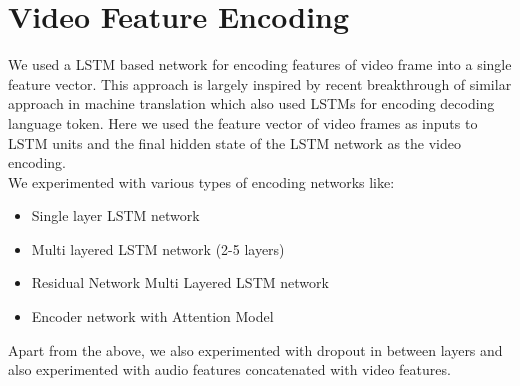 \documentclass[11pt]{article}
\begin{document}
\section {Video Feature Encoding}
	We used a LSTM based network for encoding features of video frame into a single feature vector. This approach is largely inspired by recent
	breakthrough of similar approach in machine translation which also used LSTMs for encoding decoding language token. Here we used the feature
	vector of video frames as inputs to LSTM units and the final hidden state of the LSTM network as the video encoding.\\ 
	We experimented with various types of encoding networks like:
	\begin{itemize}
		\item Single layer LSTM network
		\item Multi layered LSTM network (2-5 layers)
		\item Residual Network Multi Layered LSTM network
		\item Encoder network with Attention Model
	\end{itemize}
	Apart from the above, we also experimented with dropout in between layers and also experimented with audio features concatenated with
	video features.
\end{document}
